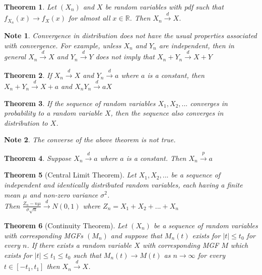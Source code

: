 \documentclass[14pt,twoside]{extreport}
\theoremstyle{dotless}
\newtheorem*{thm}{Theorem} %
\newtheorem*{note}{Note} %
\begin{document}
\begin{thm}
    Let $(X_n)$ and $X$ be random variables with pdf such that $f_{X_n}(x) \to f_X(x)$ for almost all $x \in \mathbb{R}$. 
    Then $X_n \overset{d}{\to} X$.
\end{thm}

\begin{note}
    Convergence in distribution does not have the usual properties associated with convergence. For example, unless $X_n$ and $Y_n$ are independent, then in general $X_n \overset{d}{\to} X$ and $Y_n \overset{d}{\to} Y$ does not imply that $X_n + Y_n \overset{d}{\to} X + Y$
\end{note}

\begin{thm}
    If $X_n \overset{d}{\to} X$ and $Y_n \overset{d}{\to} a$ where $a$ is a constant, then $X_n + Y_n \overset{d}{\to} X + a$ and $X_n Y_n \overset{d}{\to} aX$
\end{thm}

\begin{thm}
    If the sequence of random variables $X_1, X_2, ...$ converges in probability to a random variable $X$, then the sequence also converges in distribution to $X$.
\end{thm}

\begin{note}
    The converse of the above theorem is not true.
\end{note}

\begin{thm}
    Suppose $X_n \overset{d}{\to} a$ where $a$ is a constant. Then $X_n \overset{p}{\to} a$
\end{thm}

\begin{thm}[Central Limit Theorem]
    Let $X_1, X_2, ...$ be a sequence of independent and identically distributed random variables, each having a finite mean $\mu$ and non-zero variance $\sigma^2$. 
    \\Then $\frac{Z_n - n \mu}{\sigma \sqrt{n}} \overset{d}{\to} N(0,1)$ where $Z_n = X_1 + X_2 + ... + X_n$
\end{thm}

\begin{thm}[Continuity Theorem]
    Let $(X_n)$ be a sequence of random variables with corresponding MGFs $(M_n)$ and suppose that $M_n(t)$ exists for $|t| \leq t_0$ for every $n$. If there exists a random variable $X$ with corresponding MGF $M$ which exists for $|t| \leq t_1 \leq t_0$ such that $M_n(t) \to M(t)$ as $n \to \infty$ for every $t \in [-t_1, t_1]$ then $X_n \overset{d}{\to} X$.
\end{thm}
\end{document}

